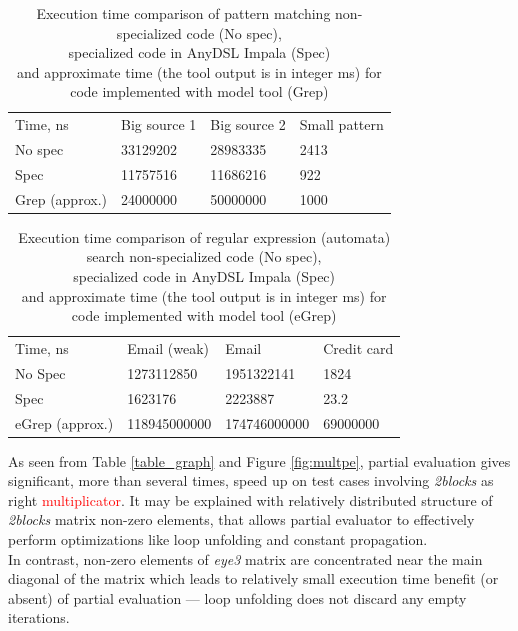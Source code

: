 \documentclass[conference]{IEEEtran}
\begin{document}
\begin{table}[]
	\begin{tabular}{llll}
		Time, ns       & Big source 1 & Big source 2 & Small pattern \\
		No spec        & 33129202     & 28983335     & 2413          \\
		Spec           & 11757516     & 11686216     & 922           \\
		Grep (approx.) & 24000000     & 50000000     & 1000                   
	\end{tabular}
	\centering
	\caption{Execution time comparison of pattern matching non-specialized code (No spec),\\ specialized code in AnyDSL Impala (Spec) \\ and approximate time (the tool output is in integer ms) for code implemented with model tool (Grep)}
	\label{table_string}
\end{table}

\begin{table}[]
	\begin{tabular}{llll}
		Time, ns        & Email (weak) & Email        & Credit card \\
		No Spec         & 1273112850   & 1951322141   & 1824        \\
		Spec            & 1623176      & 2223887      & 23.2        \\
		eGrep (approx.) & 118945000000 & 174746000000 & 69000000          
	\end{tabular}
	\centering
	\caption{Execution time comparison of regular expression (automata) search non-specialized code (No spec),\\ specialized code in AnyDSL Impala (Spec) \\ and approximate time (the tool output is in integer ms) for code implemented with model tool (eGrep)}
	\label{table_regex}
\end{table}

As seen from Table \ref{table_graph} and Figure \ref{fig:multpe}, partial evaluation gives significant, more than several times, speed up on test cases involving \textit{2blocks} as right \textcolor{red}{multiplicator}. It may be explained with relatively distributed structure of \textit{2blocks} matrix non-zero elements, that allows partial evaluator to effectively perform optimizations like loop unfolding and constant propagation.\\
In contrast, non-zero elements of \textit{eye3} matrix are concentrated near the main diagonal of the matrix which leads to relatively small execution time benefit (or absent) of partial evaluation --- loop unfolding does not discard any empty iterations.
\end{document}
